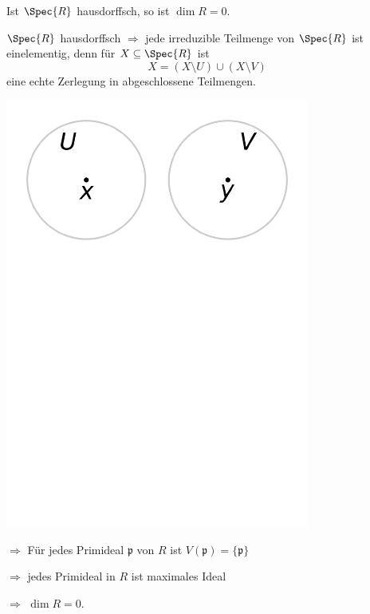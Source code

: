 \begin{Folg}
Ist $\Spec{R}$ hausdorffsch, so ist $\dim R = 0$.

\begin{Bew}
$\Spec{R}$ hausdorffsch $\Rightarrow$ jede irreduzible Teilmenge von
$\Spec{R}$ ist einelementig, denn für $X\subseteq\Spec{R}$ ist
\[
X=(X\setminus U)\cup(X\setminus V)
\]
eine echte Zerlegung in abgeschlossene
Teilmengen.

\begin{center}
	\includegraphics[width=0.75\textwidth]{images/algebra2/hausdorff.pdf}
\end{center}

$\Rightarrow$ F\"ur jedes Primideal $\mathfrak{p}$ von $R$ ist $V(\mathfrak{p}) = \{ \mathfrak{p} \}$

$\Rightarrow$ jedes Primideal in $R$ ist maximales Ideal

$\Rightarrow$ $\dim R = 0$.

\end{Bew}

\end{Folg}

